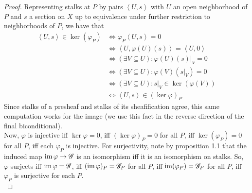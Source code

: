 \begin{proof}
	Representing stalks at $P$ by pairs $\left<U,s\right>$ with $U$ an open neighborhood of $P$ and $s$ a section on $X$ up to equivalence under further restriction to neighborhoods of $P$, we have that
	\begin{align*}
	\left<U,s\right> \in \ker(\varphi_P)
		&\iff \varphi_P\left<U,s\right> = 0 \\
		&\iff \left<U,\varphi(U)(s)\right> = \left<U,0\right> \\
		&\iff (\exists V \subseteq U) : \varphi(U)(s)|_V = 0 \\
		&\iff (\exists V \subseteq U) : \varphi(V)(s|_V) = 0 \\
		&\iff (\exists V \subseteq U) : s|_V \in \ker(\varphi(V)) \\
		&\iff \left<U,s\right> \in (\ker\varphi)_P
	\end{align*}
	Since stalks of a presheaf and stalks of its sheafification agree, this same computation works for the image (we use this fact in the reverse direction of the final biconditional). \\
	
	Now, $\varphi$ is injective iff $\ker\varphi = 0$, iff $(\ker\varphi)_P = 0$ for all $P$, iff $\ker(\varphi_P)=0$ for all $P$, iff each $\varphi_P$ is injective. For surjectivity, note by proposition 1.1 that the induced map $\operatorname{im}\varphi \to \mathscr{G}$ is an isomorphism iff it is an isomorphism on stalks. So, $\varphi$ surjects iff $\operatorname{im}\varphi = \mathscr{G}$, iff $(\operatorname{im}\varphi)_P = \mathscr{G}_P$ for all $P$, iff $\operatorname{im}(\varphi_P) = \mathscr{G}_P$ for all $P$, iff $\varphi_P$ is surjective for each $P$. \\
	
	
\end{proof}
